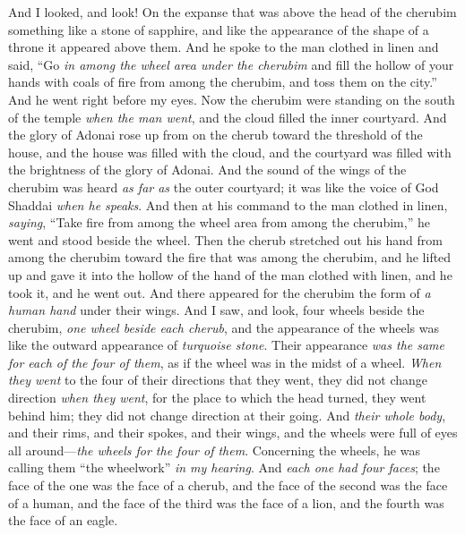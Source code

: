 \begin{biblechapter} %
 And I looked, and look! On the expanse that was above the head of the cherubim something like a stone of sapphire, and like the appearance of the shape of a throne it appeared above them.
\verse And he spoke to the man clothed in linen and said, “Go \textit{in among the wheel area under the cherubim} and fill the hollow of your hands with coals of fire from among the cherubim, and toss them on the city.” And he went right before my eyes.
\verse Now the cherubim were standing on the south of the temple \textit{when the man went}, and the cloud filled the inner courtyard.
\verse And the glory of Adonai rose up from on the cherub toward the threshold of the house, and the house was filled with the cloud, and the courtyard was filled with the brightness of the glory of Adonai.
\verse And the sound of the wings of the cherubim was heard \textit{as far as} the outer courtyard; it was like the voice of God Shaddai \textit{when he speaks}.
\verse And then at his command to the man clothed in linen, \textit{saying}, “Take fire from among the wheel area from among the cherubim,” he went and stood beside the wheel.
\verse Then the cherub stretched out his hand from among the cherubim toward the fire that was among the cherubim, and he lifted up and gave it into the hollow of the hand of the man clothed with linen, and he took it, and he went out.
\verse And there appeared for the cherubim the form of \textit{a human hand} under their wings.
\verse And I saw, and look, four wheels beside the cherubim, \textit{one wheel beside each cherub}, and the appearance of the wheels was like the outward appearance of \textit{turquoise stone}.
\verse Their appearance \textit{was the same for each of the four of them}, as if the wheel was in the midst of a wheel.
\verse \textit{When they went} to the four of their directions that they went, they did not change direction \textit{when they went}, for the place to which the head turned, they went behind him; they did not change direction at their going.
\verse And \textit{their whole body}, and their rims, and their spokes, and their wings, and the wheels were full of eyes all around—\textit{the wheels for the four of them}.
\verse Concerning the wheels, he was calling them “the wheelwork” \textit{in my hearing}.
\verse And \textit{each one had four faces}; the face of the one was the face of a cherub, and the face of the second was the face of a human, and the face of the third was the face of a lion, and the fourth was the face of an eagle.

\end{biblechapter}
